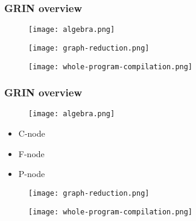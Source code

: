 \documentclass[bigger]{beamer}
\begin{document}
\begin{frame}[fragile]
\frametitle{GRIN overview}
\begin{center}

	\begin{minipage}{0.30\textwidth}
		\begin{figure}
			\texttt{[image: algebra.png]}
		\end{figure}
	\end{minipage}
	\hfill
	\begin{minipage}{0.30\textwidth}
		\begin{figure}
			\texttt{[image: graph-reduction.png]}
		\end{figure}
	\end{minipage}
	\hfill
	\begin{minipage}{0.30\textwidth}
		\begin{figure}
			\texttt{[image: whole-program-compilation.png]}
		\end{figure}
	\end{minipage}

\end{center}
\end{frame}

\begin{frame}[fragile]
\frametitle{GRIN overview}
\begin{center}

	\begin{minipage}{0.30\textwidth}
		\vspace{1cm}
		\begin{figure}
			\texttt{[image: algebra.png]}
		\end{figure}
		\vspace{-0.5cm}
		\begin{itemize}
			\item<1-> C-node
			\item<2-> F-node
			\item<3-> P-node
		\end{itemize}
	\end{minipage}
	\hfill
	\begin{minipage}{0.30\textwidth}
		\begin{figure}
			\texttt{[image: graph-reduction.png]}
		\end{figure}
	\end{minipage}
	\hfill
	\begin{minipage}{0.30\textwidth}
		\begin{figure}
			\texttt{[image: whole-program-compilation.png]}
		\end{figure}
	\end{minipage}

\end{center}
\end{frame}
\end{document}
